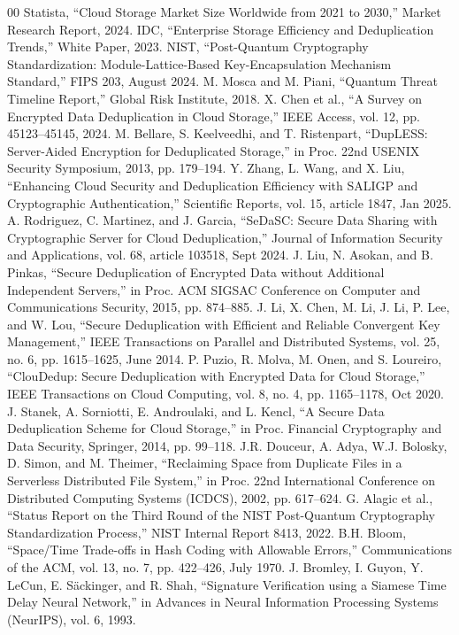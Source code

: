\documentclass[conference]{IEEEtran}
\begin{document}
\begin{thebibliography}{00}
 Statista, ``Cloud Storage Market Size Worldwide from 2021 to 2030,'' Market Research Report, 2024.
 IDC, ``Enterprise Storage Efficiency and Deduplication Trends,'' White Paper, 2023.
 NIST, ``Post-Quantum Cryptography Standardization: Module-Lattice-Based Key-Encapsulation Mechanism Standard,'' FIPS 203, August 2024.
 M. Mosca and M. Piani, ``Quantum Threat Timeline Report,'' Global Risk Institute, 2018.
 X. Chen et al., ``A Survey on Encrypted Data Deduplication in Cloud Storage,'' IEEE Access, vol. 12, pp. 45123--45145, 2024.
 M. Bellare, S. Keelveedhi, and T. Ristenpart, ``DupLESS: Server-Aided Encryption for Deduplicated Storage,'' in Proc. 22nd USENIX Security Symposium, 2013, pp. 179--194.
 Y. Zhang, L. Wang, and X. Liu, ``Enhancing Cloud Security and Deduplication Efficiency with SALIGP and Cryptographic Authentication,'' Scientific Reports, vol. 15, article 1847, Jan 2025.
 A. Rodriguez, C. Martinez, and J. Garcia, ``SeDaSC: Secure Data Sharing with Cryptographic Server for Cloud Deduplication,'' Journal of Information Security and Applications, vol. 68, article 103518, Sept 2024.
 J. Liu, N. Asokan, and B. Pinkas, ``Secure Deduplication of Encrypted Data without Additional Independent Servers,'' in Proc. ACM SIGSAC Conference on Computer and Communications Security, 2015, pp. 874--885.
 J. Li, X. Chen, M. Li, J. Li, P. Lee, and W. Lou, ``Secure Deduplication with Efficient and Reliable Convergent Key Management,'' IEEE Transactions on Parallel and Distributed Systems, vol. 25, no. 6, pp. 1615--1625, June 2014.
 P. Puzio, R. Molva, M. Onen, and S. Loureiro, ``ClouDedup: Secure Deduplication with Encrypted Data for Cloud Storage,'' IEEE Transactions on Cloud Computing, vol. 8, no. 4, pp. 1165--1178, Oct 2020.
 J. Stanek, A. Sorniotti, E. Androulaki, and L. Kencl, ``A Secure Data Deduplication Scheme for Cloud Storage,'' in Proc. Financial Cryptography and Data Security, Springer, 2014, pp. 99--118.
 J.R. Douceur, A. Adya, W.J. Bolosky, D. Simon, and M. Theimer, ``Reclaiming Space from Duplicate Files in a Serverless Distributed File System,'' in Proc. 22nd International Conference on Distributed Computing Systems (ICDCS), 2002, pp. 617--624.
 G. Alagic et al., ``Status Report on the Third Round of the NIST Post-Quantum Cryptography Standardization Process,'' NIST Internal Report 8413, 2022.
 B.H. Bloom, ``Space/Time Trade-offs in Hash Coding with Allowable Errors,'' Communications of the ACM, vol. 13, no. 7, pp. 422--426, July 1970.
 J. Bromley, I. Guyon, Y. LeCun, E. S\"ackinger, and R. Shah, ``Signature Verification using a Siamese Time Delay Neural Network,'' in Advances in Neural Information Processing Systems (NeurIPS), vol. 6, 1993.
\end{thebibliography}
\vspace{12pt}
\end{document}
